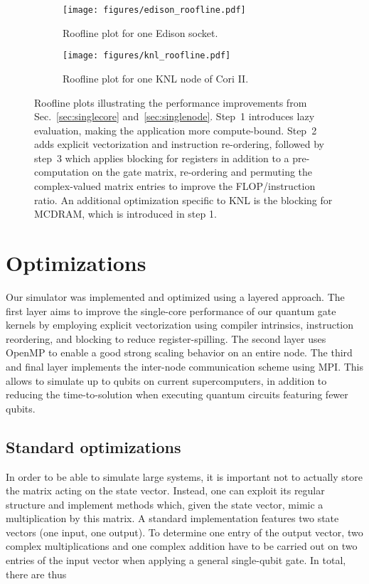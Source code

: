 \documentclass[sigconf]{acmart}
\begin{document}
\begin{figure*}[t]
\centering
\begin{subfigure}{.45\linewidth}
\texttt{[image: figures/edison\_roofline.pdf]}
\caption{Roofline plot for one Edison socket.}
\label{fig:rooflineedison}
\end{subfigure}
\begin{subfigure}{.45\linewidth}
\centering
\texttt{[image: figures/knl\_roofline.pdf]}
\caption{Roofline plot for one KNL node of Cori II. }
\label{fig:rooflineknl}
\end{subfigure}
\caption{Roofline plots illustrating the performance improvements from Sec.~\ref{sec:singlecore} and~\ref{sec:singlenode}. Step~1 introduces lazy evaluation, making the application more compute-bound. Step~2 adds explicit vectorization and instruction re-ordering, followed by step~3 which applies blocking for registers in addition to a pre-computation on the gate matrix, re-ordering and permuting the complex-valued matrix entries to improve the FLOP/instruction ratio. An additional optimization specific to KNL is the blocking for MCDRAM, which is introduced in step 1.}
\end{figure*}

\section{Optimizations}
Our simulator was implemented and optimized using a layered approach. The first layer aims to improve the single-core performance of our quantum gate kernels by employing explicit vectorization using compiler intrinsics, instruction reordering, and blocking to reduce register-spilling. The second layer uses OpenMP to enable a good strong scaling behavior on an entire node. The third and final layer implements the inter-node communication scheme using MPI. This allows to simulate up to  qubits on current supercomputers, in addition to reducing the time-to-solution when executing quantum circuits featuring fewer qubits.

\subsection{Standard optimizations}

In order to be able to simulate large systems, it is important not to actually store the  matrix acting on the state vector. Instead, one can exploit its regular structure and implement methods which, given the state vector, mimic a multiplication by this matrix.
A standard implementation features two state vectors (one input, one output). To determine one entry of the output vector, two complex multiplications and one complex addition have to be carried out on two entries of the input vector when applying a general single-qubit gate. In total, there are thus
\end{document}
